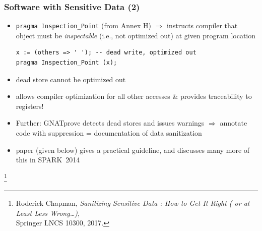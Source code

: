 \begin{frame}[fragile]
  \frametitle{Software with Sensitive Data (2)}  
  \begin{itemize}
\item \texttt{pragma Inspection\_Point} (from Annex H) $\Rightarrow$
    instructs compiler that object must be \emph{inspectable} (i.e.,
    not optimized out) at given program location
\begin{lstlisting}
x := (others => ' '); -- dead write, optimized out
pragma Inspection_Point (x);
\end{lstlisting}
  \item dead store cannot be optimized out
  \item allows compiler optimization for all other accesses \& provides traceability to registers!
  \item Further: GNATprove detects dead stores and issues warnings $\Rightarrow$ annotate code with suppression = documentation of data sanitization
  \item paper (given below) gives a practical guideline, and discusses many more of this in SPARK~2014
  \end{itemize}
  \footnote{\hspace{-.56cm}\tiny Roderick Chapman, \emph{Sanitizing Sensitive Data : How to Get It Right ( or at Least Less Wrong\dots)}, \\Springer LNCS 10300, 2017.}
\end{frame}